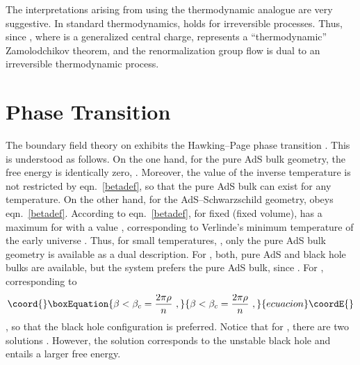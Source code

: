 \documentclass[a4paper,12pt]{article}
\begin{document}
The interpretations arising from using the thermodynamic analogue are very
suggestive. In standard thermodynamics, \coordHE{} holds for irreversible
processes. Thus, since \coordHE{}, where \coordHE{} is a generalized
central charge, \coordHE{} represents a ``thermodynamic''
Zamolodchikov theorem, and the renormalization group flow is dual to
an irreversible thermodynamic process.


\section{Phase Transition}
\label{landau}
The boundary field theory on \coordHE{} exhibits the
Hawking--Page phase transition \cite{Hawking83}. This is understood as
follows. On the one hand, for the pure AdS bulk geometry, the free
energy is identically zero, \coordHE{}. Moreover, the value of the inverse
temperature \myHighlight{$\beta$}\coordHE{} is not restricted by eqn.\ \eqref{betadef}, so
that the pure AdS bulk can exist for any temperature. On the
other hand, for the AdS--Schwarzschild geometry, \myHighlight{$\beta$}\coordHE{} obeys eqn.\
\eqref{betadef}. According to eqn.\ \eqref{betadef}, for fixed \myHighlight{$\rho$}\coordHE{}
(fixed volume), \myHighlight{$\beta$}\coordHE{} has a maximum for \coordHE{} with
a value \myHighlight{$\beta_{max} = 2\pi \rho/\sqrt{n^2-1}$}\coordHE{}, corresponding to
Verlinde's minimum temperature of the early universe
\cite{Verlinde00}. Thus, for small
temperatures, \coordHE{}, only the pure AdS bulk geometry is
available as a dual description. For \myHighlight{$\sqrt{(n-1)/(n+1)}\le \rh <1$}\coordHE{},
both, pure AdS and black hole bulks are available, but the
system prefers the pure AdS bulk, since \coordHE{}. For
\myHighlight{$\rh>1$}\coordHE{}, corresponding to
\begin{equation}\coord{}\boxEquation{
\label{betacrit}
  \beta < \beta_c = \frac{2\pi\rho}n~,
}{
\beta < \beta_c = \frac{2\pi\rho}n~,
}{ecuacion}\coordE{}\end{equation}
\coordHE{}, so that the black hole configuration is
preferred. Notice that for \myHighlight{$\beta<\beta_{max}$}\coordHE{}, there are two
solutions \myHighlight{$\rh$}\coordHE{}. However, the solution \myHighlight{$\rh <
\sqrt{(n-1)/(n+1)}$}\coordHE{} corresponds to the unstable black hole
\cite{Hawking83} and entails a larger free energy.
\end{document}
